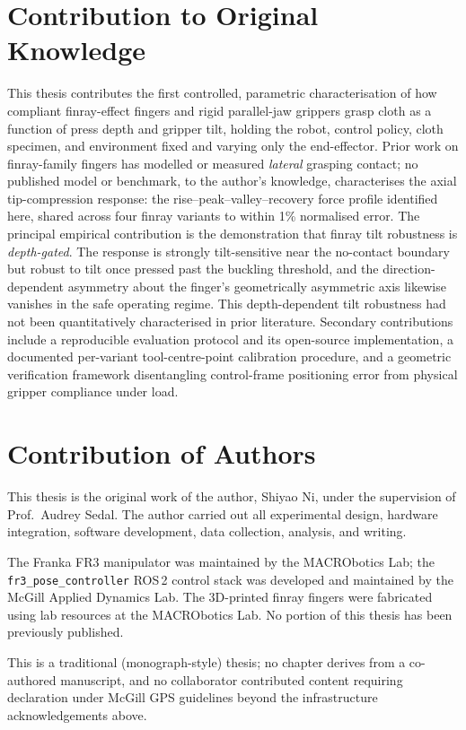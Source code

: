 \chapter*{\rm\bfseries Contribution to Original Knowledge}

This thesis contributes the first controlled, parametric characterisation
of how compliant finray-effect fingers and rigid parallel-jaw grippers
grasp cloth as a function of press depth and gripper tilt, holding the
robot, control policy, cloth specimen, and environment fixed and varying
only the end-effector. Prior work on finray-family fingers has modelled
or measured \emph{lateral} grasping contact; no published model or
benchmark, to the author's knowledge, characterises the axial
tip-compression response: the rise--peak--valley--recovery force
profile identified here, shared across four finray variants to within
1\% normalised error. The principal empirical contribution is the
demonstration that finray tilt robustness is \emph{depth-gated}. The
response is strongly tilt-sensitive near the no-contact boundary but
robust to tilt once pressed past the buckling threshold, and the
direction-dependent asymmetry about the finger's geometrically
asymmetric axis likewise vanishes in the safe operating regime. This depth-dependent tilt robustness had
not been quantitatively characterised in prior literature. Secondary
contributions include a reproducible evaluation protocol and its
open-source implementation, a documented per-variant tool-centre-point
calibration procedure, and a geometric verification framework
disentangling control-frame positioning error from physical gripper
compliance under load.

\chapter*{\rm\bfseries Contribution of Authors}

This thesis is the original work of the author, Shiyao Ni, under the
supervision of Prof.\ Audrey Sedal. The author carried out all experimental
design, hardware integration, software development, data collection, analysis,
and writing.

The Franka FR3 manipulator was maintained by the MACRObotics Lab; the
\texttt{fr3\_pose\_controller} ROS\,2 control stack was developed and
maintained by the McGill Applied Dynamics Lab. The 3D-printed finray fingers were
fabricated using lab resources at the MACRObotics Lab. No portion of this
thesis has been previously published.

This is a traditional (monograph-style) thesis; no chapter derives from a
co-authored manuscript, and no collaborator contributed content requiring
declaration under McGill GPS guidelines beyond the infrastructure
acknowledgements above.
